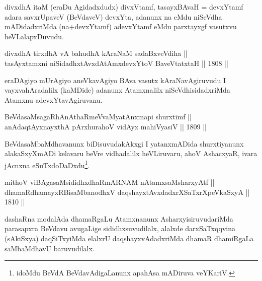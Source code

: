\begin{artha}
divxdhA itaM (eraDu Agidadxdudx) divxVtamf, tasayxBAvaH = devxYtamf
adara savxrUpaveV (BeVdaveV) devxYta, adanunx na eMdu niSeVdha
mADidadxriMda (na+devxYtamf) adevxYtamf eMdu parxtayxgf vasutxvu
heVLalapxDuvudu.
\end{artha}


\begin{shl}
divxdhA tirxdhA vA bahudhA kAraNaM sadaBxveVdiha || \\
tasAyx\s \s tamxni niSidadhxtAvxdAtAmx\s devxYtoV BaveVtatxtaH \hfill || 1808 ||  
\end{shl}

\begin{artha}
eraDAgiyo mUrAgiyo aneVkavAgiyo BAva vasutx kAraNavAgiruvudu I
vayxvahAradalilx (kaMDide) adanunx Atamxnalilx niSeVdhisidadxriMda
Atamxnu adevxYtavAgiruvanu.
\end{artha}


\begin{shl}
BeVdasaMsagaRhAnAthaRmeVvaMyatAnxmapi shurxtimf ||  \\
anAdaqtAyxnayxthA pArxhurahoV vidAyx mahiVyasiV \hfill || 1809 ||  
\end{shl}

\begin{artha}
BeVdasaMbaMdhavanunx biDisuvudakAkxgi I yatanxmADida shurxtiyanunx
alakaSxyXmADi kelavaru beVre vidhadalilx heVLiruvaru, ahoV AshacxyaR,
ivara jAcnxna eSuTxdoDaDxdu\footnote[1]{idoMdu BeVdA BeVdavAdigaLanunx
apahAsa mADiruva veYKariV.}.
\end{artha}

\begin{shl}
mithoV viBAgasaMsididhxdhaRmARNAM nA\s \s tamxsaMsharxyAtf || \\
dhamaRdhamayxRBisaMbanodhxV daqshayxtAvxdadxrXSaTxrXpeVkaSxyA \hfill || 1810 ||  
\end{shl}

\begin{artha}
dashaRna modalAda dhamaRgaLu Atamxnanunx AsharxyisiruvudariMda
parasapxra BeVdavu avugaLige sididhxsuvudilalx,
alalxde darxSaTxqqvina (sAkiSxya) daqSiTxyiMda elalxrU
daqshayxvAdadxriMda dhamaR dhamiRgaLa saMbaMdhavU baruvudilalx.
\end{artha}



